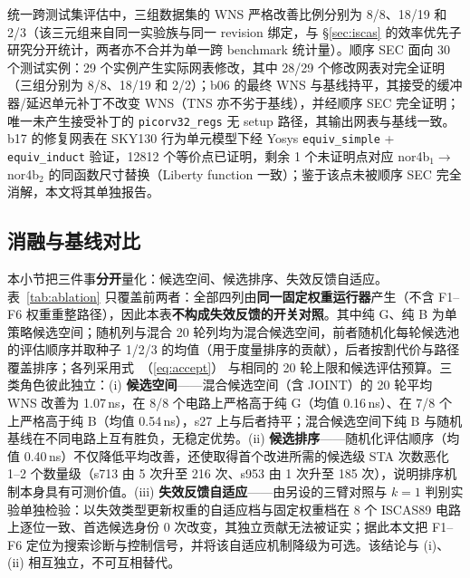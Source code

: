 \documentclass[twocolumn,10pt,fontset=windows]{ctexart}
\renewcommand{\eqref}[1]{\textup{（\ref{#1}）}}
\begin{document}
统一跨测试集评估中，三组数据集的 WNS 严格改善比例分别为 8/8、18/19 和 2/3（该三元组来自同一实验族与同一 revision 绑定，与 \S\ref{sec:iscas} 的效率优先子研究分开统计，两者亦不合并为单一跨 benchmark 统计量）。顺序 SEC 面向 30 个测试实例：29 个实例产生实际网表修改，其中 28/29 个修改网表对完全证明（三组分别为 8/8、18/19 和 2/2）；b06 的最终 WNS 与基线持平，其接受的缓冲器/延迟单元补丁不改变 WNS（TNS 亦不劣于基线），并经顺序 SEC 完全证明；唯一未产生接受补丁的 \texttt{picorv32\_regs} 无 setup 路径，其输出网表与基线一致。b17 的修复网表在 SKY130 行为单元模型下经 Yosys \texttt{equiv\_simple} + \texttt{equiv\_induct} 验证，12812 个等价点已证明，剩余 1 个未证明点对应 nor4b$_1\!\to\!$nor4b$_2$ 的同函数尺寸替换（Liberty function 一致）；鉴于该点未被顺序 SEC 完全消解，本文将其单独报告。

\subsection{消融与基线对比}\label{sec:ablation}

本小节把三件事\textbf{分开}量化：候选空间、候选排序、失效反馈自适应。表~\ref{tab:ablation} 只覆盖前两者：全部四列由\textbf{同一固定权重运行器}产生（不含 F1--F6 权重重整路径），因此本表\textbf{不构成失效反馈的开关对照}。其中纯 G、纯 B 为单策略候选空间；随机列与混合 20 轮列均为混合候选空间，前者随机化每轮候选池的评估顺序并取种子 1/2/3 的均值（用于度量排序的贡献），后者按割代价与路径覆盖排序；各列采用式~\eqref{eq:accept} 与相同的 20 轮上限和候选评估预算。三类角色彼此独立：(i) \textbf{候选空间}——混合候选空间（含 JOINT）的 20 轮平均 WNS 改善为 1.07\,ns，在 8/8 个电路上严格高于纯 G（均值 0.16\,ns）、在 7/8 个上严格高于纯 B（均值 0.54\,ns），s27 上与后者持平；混合候选空间下纯 B 与随机基线在不同电路上互有胜负，无稳定优势。(ii) \textbf{候选排序}——随机化评估顺序（均值 0.40\,ns）不仅降低平均改善，还使取得首个改进所需的候选级 STA 次数恶化 1--2 个数量级（s713 由 5 次升至 216 次、s953 由 1 次升至 185 次），说明排序机制本身具有可测价值。(iii) \textbf{失效反馈自适应}——由另设的三臂对照与 $k=1$ 判别实验单独检验：以失效类型更新权重的自适应档与固定权重档在 8 个 ISCAS89 电路上逐位一致、首选候选身份 0 次改变，其独立贡献无法被证实；据此本文把 F1--F6 定位为搜索诊断与控制信号，并将该自适应机制降级为可选。该结论与 (i)、(ii) 相互独立，不可互相替代。
\end{document}
